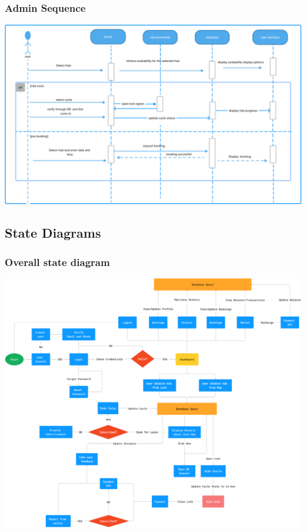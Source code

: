 \documentclass[11pt]{article}
\begin{document}
\subsubsection{Admin Sequence}
\begin{center}
  \includegraphics[scale=0.25]{sequence-diagram-images/admin.png}
\end{center}


\subsection{State Diagrams}
\subsubsection{Overall state diagram}
\begin{center}
  \includegraphics[scale=0.105]{state-diagram-images/overall.png}
\end{center}
\end{document}
